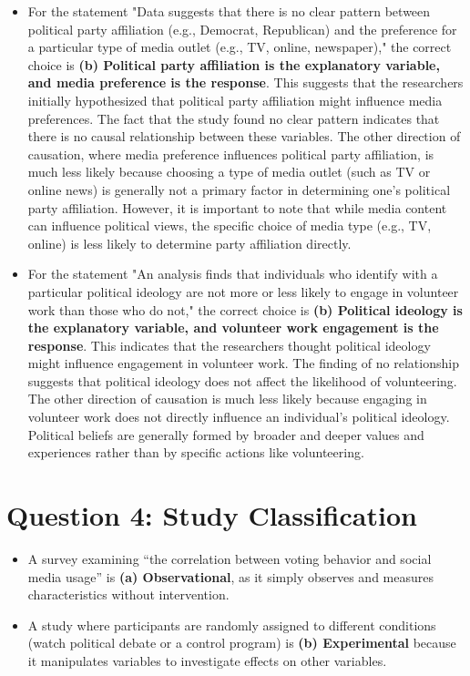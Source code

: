 \documentclass{article}
\begin{document}
\begin{itemize}
    \item For the statement "Data suggests that there is no clear pattern between political party affiliation (e.g., Democrat, Republican) and the preference for a particular type of media outlet (e.g., TV, online, newspaper)," the correct choice is \textbf{(b) Political party affiliation is the explanatory variable, and media preference is the response}. This suggests that the researchers initially hypothesized that political party affiliation might influence media preferences. The fact that the study found no clear pattern indicates that there is no causal relationship between these variables. The other direction of causation, where media preference influences political party affiliation, is much less likely because choosing a type of media outlet (such as TV or online news) is generally not a primary factor in determining one's political party affiliation. However, it is important to note that while media content can influence political views, the specific choice of media type (e.g., TV, online) is less likely to determine party affiliation directly.
    \item For the statement "An analysis finds that individuals who identify with a particular political ideology are not more or less likely to engage in volunteer work than those who do not," the correct choice is \textbf{(b) Political ideology is the explanatory variable, and volunteer work engagement is the response}. This indicates that the researchers thought political ideology might influence engagement in volunteer work. The finding of no relationship suggests that political ideology does not affect the likelihood of volunteering. The other direction of causation is much less likely because engaging in volunteer work does not directly influence an individual's political ideology. Political beliefs are generally formed by broader and deeper values and experiences rather than by specific actions like volunteering.
\end{itemize}


\section*{Question 4: Study Classification}
\begin{itemize}
    \item A survey examining ``the correlation between voting behavior and social media usage'' is \textbf{(a) Observational}, as it simply observes and measures characteristics without intervention.
    \item A study where participants are randomly assigned to different conditions (watch political debate or a control program) is \textbf{(b) Experimental} because it manipulates variables to investigate effects on other variables.
\end{itemize}
\end{document}
